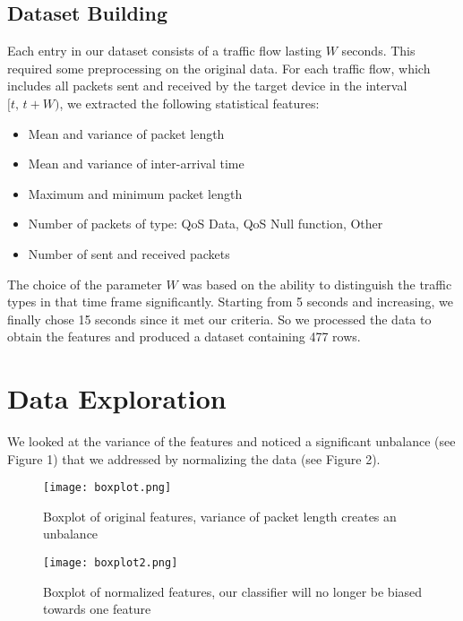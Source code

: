 \documentclass[11pt, USenglish]{article}
\begin{document}
\subsection{Dataset Building}

Each entry in our dataset consists of a traffic flow lasting $W$ seconds. This required some preprocessing on the original data. For each traffic flow, which includes all packets sent and received by the target device in the interval $[t, \,t + W)$, we extracted the following statistical features:

\begin{itemize}
	\itemsep-0.3em 
	\item Mean and variance of packet length
	\item Mean and variance of inter-arrival time
	\item Maximum and minimum packet length
	\item Number of packets of type: QoS Data, QoS Null function, Other
	\item Number of sent and received packets
\end{itemize}


The choice of the parameter $W$ was based on the ability to distinguish the traffic types in that time frame significantly. Starting from 5 seconds and increasing, we finally chose 15 seconds since it met our criteria. So we processed the data to obtain the features and produced a dataset containing 477 rows.


\section{Data Exploration}

We looked at the variance of the features and noticed a significant unbalance (see Figure 1) that we addressed by normalizing the data (see Figure 2). 

\begin{figure}
	\begin{minipage}[c]{0.4\linewidth}
		\texttt{[image: boxplot.png]}
		\caption{Boxplot of original features, variance of packet length creates an unbalance}
	\end{minipage}
	\hfill
	\begin{minipage}[c]{0.4\linewidth}
		\texttt{[image: boxplot2.png]}
		\caption{Boxplot of normalized features, our classifier will no longer be biased towards one feature}
	\end{minipage}%
\end{figure}
\end{document}
